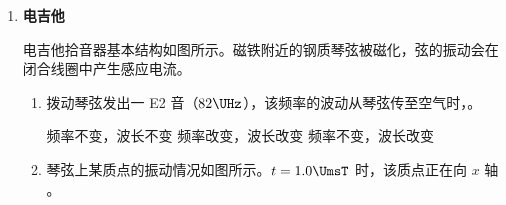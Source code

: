 \documentclass[\gkver]{gaokaozhenti}
\begin{document}
\begin{enumerate}
{正确选项为 AD。

2．（1）匀强电场中电场强度和电势差的关系是 $E=\frac{U}{d}$。

（2）电荷在电场中运动时，电场力做正功，导致电势能减少，可得 $E_{p1} > E_{p2}$；由电路图可知电容器左极板带正电，因此极板间的电场线方向向右，液滴在此区域向左逆电场线方向运动，电势升高，即 $\varphi_{1} < \varphi_{2}$。

正确选项为 D。

（3）电路稳定时两板间电压等于电源电动势，与电阻无关，A、B 选项错误；

液滴在竖直方向做自由落体运动，若电容器整体上移，则在板间运动的时间 $t$ 变大，离开电场的竖直速度 $v_{y}$ 减小；水平方向做匀加速运动，水平距离 $x=\frac{1}{2}a_{x}t^{2}$、水平速度 $v_{x}=a_{x}t$ 也随之变大，与竖直方向的夹角 $\tan\theta=\frac{v_{x}}{v_{y}}$ 也增大，使液滴离开电场后会比之前更偏向左运动，能落至 $b$ 点。选项 C 正确 D 错误。

电容器右极板向左移动，两板间距离减小，导致水平方向加速度 $a_{x}$ 增大，水平距离 $x$、与竖直方向的夹角 $\tan\theta$ 都增大，使液滴离开电场后会比之前更偏向左运动，能落至 $b$ 点。选项 E 正确 F 错误。

正确选项为 CE。

（4）根据玻尔理论的频率条件，两个能级的能量差 $\Delta E=h\nu=\frac{hc}{\lambda}$。

3．根据德布罗意波长公式，氦原子的物质波波长 $\lambda=\frac{h}{mv}$，由 $\frac{h}{mv}<\lambda$ 解得速度 $v>\frac{h}{m\lambda}$。

正确选项为 C。
}

\item
\textbf{电吉他}

电吉他拾音器基本结构如图所示。磁铁附近的钢质琴弦被磁化，弦的振动会在闭合线圈中产生感应电流。

\onepicture[h=3.5cm, align=right]{}
\begin{enumerate}
	\item
	拨动琴弦发出一 E2 音（$82 \UHz$），该频率的波动从琴弦传至空气时，。

	{频率不变，波长不变}
	{频率改变，波长改变}
	{频率不变，波长改变}

	\item
	琴弦上某质点的振动情况如图所示。$t=1.0 \UmsT$ 时，该质点正在向 $x$ 轴 。


\end{enumerate}
\end{enumerate}
\end{document}
